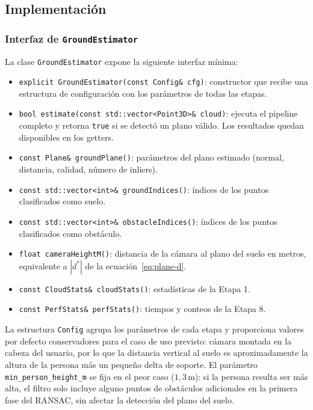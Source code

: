 \subsection{Implementación}

\subsubsection{Interfaz de \texttt{GroundEstimator}}

La clase \texttt{GroundEstimator} expone la siguiente interfaz mínima:

\begin{itemize}
  \item \texttt{explicit GroundEstimator(const Config\& cfg)}: constructor
        que recibe una estructura de configuración con los parámetros de
        todas las etapas.
  \item \texttt{bool estimate(const std::vector<Point3D>\& cloud)}: ejecuta
        el pipeline completo y retorna \texttt{true} si se detectó un plano
        válido. Los resultados quedan disponibles en los getters.
  \item \texttt{const Plane\& groundPlane()}: parámetros del plano estimado
        (normal, distancia, calidad, número de inliers).
  \item \texttt{const std::vector<int>\& groundIndices()}: índices de los
        puntos clasificados como suelo.
  \item \texttt{const std::vector<int>\& obstacleIndices()}: índices de los
        puntos clasificados como obstáculo.
  \item \texttt{float cameraHeightM()}: distancia de la cámara al plano del
        suelo en metros, equivalente a $|d^*|$ de la
        ecuación~\ref{eq:plane-d}.
  \item \texttt{const CloudStats\& cloudStats()}: estadísticas de la Etapa 1.
  \item \texttt{const PerfStats\& perfStats()}: tiempos y conteos de la
        Etapa 8.
\end{itemize}

La estructura \texttt{Config} agrupa los parámetros de cada etapa y
proporciona valores por defecto conservadores para el caso de uso previsto:
cámara montada en la cabeza del usuario, por lo que la distancia vertical al
suelo es aproximadamente la altura de la persona más un pequeño delta de
soporte. El parámetro \texttt{min\_person\_height\_m} se fija en el peor caso
($1{,}3\,\text{m}$): si la persona resulta ser más alta, el filtro solo incluye
alguno puntos de obstáculos adicionales en la primera fase del RANSAC, sin
afectar la detección del plano del suelo.

